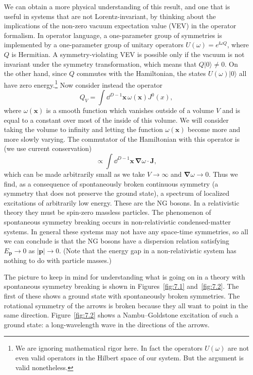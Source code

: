 We can obtain a more physical understanding of this result, and one that is
useful in systems that are not Lorentz-invariant, by thinking about the
implications of the non-zero vacuum expectation value (VEV) in the operator
formalism. In operator language, a one-parameter group of symmetries is
implemented by a one-parameter group of unitary operators
$U(\omega)=e^{\ii\omega Q}$, where $Q$ is Hermitian. A symmetry-violating VEV
is possible only if the vacuum is not invariant under the symmetry
transformation, which means that $Q|0\rangle\ne0$. On the other hand, since
$Q$ commutes with the Hamiltonian, the states $U(\omega)|0\rangle$ all have
zero energy.\footnote[6]{We are ignoring mathematical rigor here. In fact the
operators $U(\omega)$ are not even valid operators in the Hilbert space of our
system. But the argument is valid nonetheless.} Now consider instead the
operator
\begin{equation*}
  Q_V=\int\dd^{D-1}\mathbf x\,\omega(\mathbf x)J^0(x),
\end{equation*}
where $\omega(\mathbf x)$ is a smooth function which vanishes outside of a volume $V$
and is equal to a constant over most of the inside of this volume. We will
consider taking the volume to infinity and letting the function $\omega(\mathbf x)$
become more and more slowly varying. The commutator of the Hamiltonian with
this operator is (we use current conservation)
\begin{equation*}
  [H,Q_V]\propto\int\dd^{D-1}\mathbf x\,\boldsymbol\nabla\omega\cdot\mathbf J,
\end{equation*}
which can be made arbitrarily small as we take $V\to\infty$ and
$\boldsymbol\nabla\omega\to0$. Thus we find, as a consequence of spontaneously
broken continuous symmetry (a symmetry that does not preserve the ground state),
a spectrum of localized excitations of arbitrarily low energy. These are the NG
bosons. In a relativistic theory they must be spin-zero massless particles. The
phenomenon of spontaneous symmetry breaking occurs in non-relativistic
condensed-matter systems. In general these systems may not have any space-time
symmetries, so all we can conclude is that the NG bosons have a dispersion
relation satisfying $E_{\mathbf p}\to0$ as $|\mathbf p|\to0$. (Note that the energy gap in a
non-relativistic system has nothing to do with particle masses.)

The picture to keep in mind for understanding what is going on in a theory with
spontaneous symmetry breaking is shown in Figures~\ref{fig:7.1} and~\ref{fig:7.2}.
The first of these shows a ground state with spontaneously broken symmetries.
The rotational symmetry of the arrows is broken because they all want to point
in the same direction. Figure~\ref{fig:7.2} shows a Nambu--Goldstone excitation
of such a ground state: a long-wavelength wave in the directions of the arrows.


